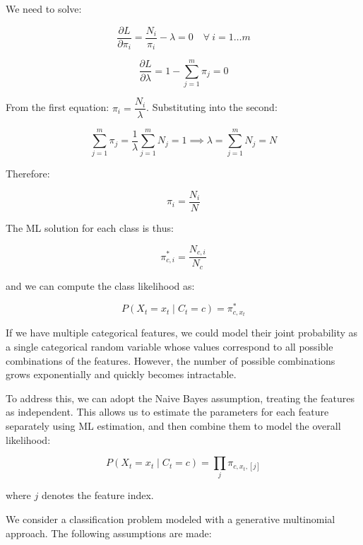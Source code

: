 We need to solve:

\begin{equation*}
\frac{\partial L}{\partial \pi_i} = \frac{N_i}{\pi_i} - \lambda = 0 \quad \forall\ i=1\ldots m
\end{equation*}

\begin{equation*}
\frac{\partial L}{\partial \lambda} = 1 - \sum_{j=1}^m \pi_j = 0
\end{equation*}

From the first equation: $\pi_i = \dfrac{N_i}{\lambda}$. Substituting into the second:

\begin{equation*}
\sum_{j=1}^m \pi_j = \frac{1}{\lambda} \sum_{j=1}^m N_j = 1 \implies \lambda = \sum_{j=1}^m N_j = N
\end{equation*}

Therefore:

\begin{equation*}
\pi_i = \frac{N_i}{N}
\end{equation*}

The ML solution for each class is thus:

\begin{equation*}
\pi_{c,i}^* = \frac{N_{c,i}}{N_c}
\end{equation*}

and we can compute the class likelihood as:

\begin{equation*}
P(X_t = x_t \mid C_t = c) = \pi_{c, x_t}^*
\end{equation*}

If we have multiple categorical features, we could model their joint probability as a single categorical random variable whose values correspond to all possible combinations of the features. However, the number of possible combinations grows exponentially and quickly becomes intractable.

To address this, we can adopt the Naive Bayes assumption, treating the features as independent. This allows us to estimate the parameters for each feature separately using ML estimation, and then combine them to model the overall likelihood:

\begin{equation*}
P(X_t = x_t \mid C_t = c) = \prod_j \pi_{c, x_t, [j]}
\end{equation*}

where $j$ denotes the feature index.

We consider a classification problem modeled with a generative multinomial approach. The following assumptions are made:

